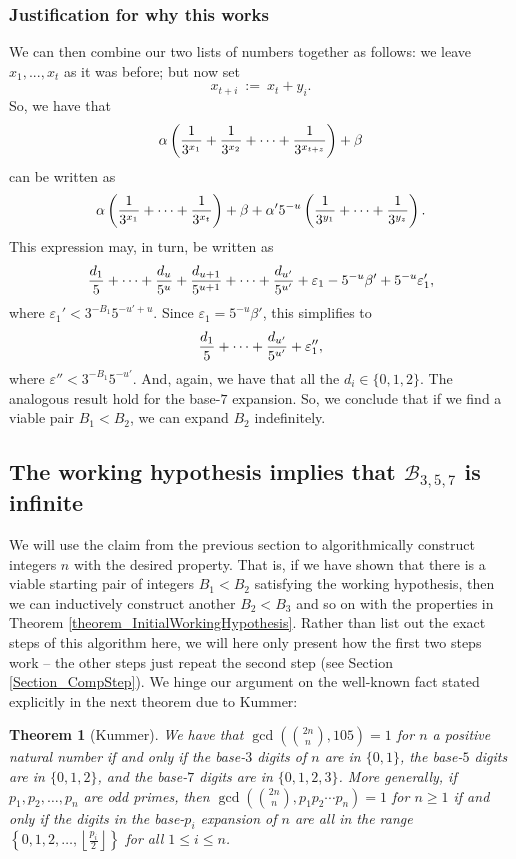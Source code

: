 \documentclass[12pt]{article}
\newtheorem{theorem}{Theorem}
\begin{document}
\subsubsection{Justification for why this works} 

We can then combine our two lists of numbers together as follows:  we leave
$x_1,...,x_t$ as it was before; but now set
$$
x_{t+i}\ :=\ x_t + y_i. 
$$
So, we have that 
$$
\alpha \left ( {1 \over 3^{x_1}} + {1 \over 3^{x_2}} + \cdots + 
{1 \over 3^{x_{t+z}}} \right ) + \beta
$$
can be written as
$$
\alpha \left ( {1 \over 3^{x_1}} + \cdots + {1 \over 3^{x_t}}\right ) + \beta
+ \alpha' 5^{-u} \left ( {1 \over 3^{y_1}} + \cdots + {1 \over 3^{y_z}} \right ).
$$
This expression may, in turn, be written as
$$
{d_1 \over 5} + \cdots + {d_u \over 5^u} + {d_{u+1} \over 5^{u+1}} 
+ \cdots + {d_{u'} \over 5^{u'}} + \varepsilon_1 - 5^{-u} \beta' + 
5^{-u} \varepsilon_1',
$$
where $\varepsilon_1' < 3^{-B_1} 5^{-u'+u}$.  Since $\varepsilon_1 = 5^{-u}\beta'$, this simplifies to
$$
{d_1 \over 5} + \cdots + {d_{u'} \over 5^{u'}} + \varepsilon_1'',
$$
where $\varepsilon'' < 3^{-B_1} 5^{-u'}$.
And, again, we have that all the $d_i \in \{0,1,2\}$.
The analogous result hold for the base-$7$ expansion.  So, we conclude 
that if we find a viable pair $B_1 < B_2$, we can expand $B_2$ indefinitely.

\subsection{The working hypothesis implies that $\mathcal{B}_{3,5,7}$ is infinite}

We will use the claim from the previous section to algorithmically construct
integers $n$ with the desired property.  That is, if we have shown that there is a viable 
starting pair of integers $B_1 < B_2$ satisfying the working hypothesis, then we can inductively 
construct another $B_2 < B_3$ and so on with the properties in 
Theorem \ref{theorem_InitialWorkingHypothesis}. 
Rather than list out the exact
steps of this algorithm here, we will here only present how the first two 
steps work -- the other steps just repeat the second step (see Section \ref{Section_CompStep}).
We hinge our argument on the well-known fact stated explicitly in the next theorem due to Kummer:

\begin{theorem}[Kummer]
\label{theorem_Kummer} 
We have that $\gcd({2n \choose n},105) = 1$ for $n$ a positive natural number if and
only if the base-$3$ digits of $n$ are in $\{0,1\}$,
the base-$5$ digits are in $\{0,1,2\}$, and the base-$7$ digits are in 
$\{0,1,2,3\}$. More generally, if $p_1,p_2,\ldots,p_n$ are odd primes, then 
$\gcd({2n \choose n},p_1p_2\cdots p_n) = 1$ for $n \geq 1$ if and only if the digits in the 
base-$p_i$ expansion of $n$ are all in the range 
$\left\{0,1,2,\ldots,\left\lfloor \frac{p_i}{2} \right\rfloor\right\}$ 
for all $1 \leq i \leq n$. 
\end{theorem} 
\end{document}

